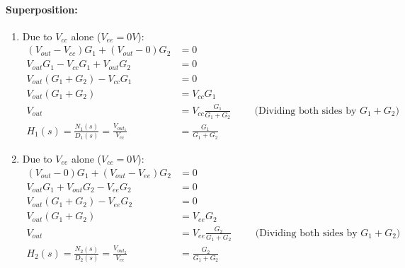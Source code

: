 \paragraph{Superposition:}
\begin{enumerate}
  \item Due to \(V_{cc}\) alone (\(V_{ee} = 0V\)):
    \begin{align*}
      (V_{out} - V_{cc}){G_1} + (V_{out} - 0){G_2} &= 0 \\
      V_{out}G_1 - V_{cc}G_1 + V_{out}G_2 &= 0 \\
      V_{out}(G_1 + G_2) - V_{cc}G_1 &= 0 \\
      V_{out}(G_1 + G_2) &= V_{cc}G_1 \\
      V_{out} &= V_{cc}\frac{G_1}{G_1 + G_2} \hspace{1cm} \text{(Dividing both sides by \(G_1 + G_2\))} \\
      H_1(s) = \frac{N_1(s)}{D_1(s)} = \frac{V_{out_1}}{V_{cc}} &= \frac{G_1}{G_1 + G_2}
    \end{align*}
  \item Due to \(V_{ee}\) alone (\(V_{cc} = 0V\)):
    \begin{align*}
      (V_{out} - 0){G_1} + (V_{out} - V_{ee}){G_2} &= 0 \\
      V_{out}G_1 + V_{out}G_2 - V_{ee}G_2 &= 0 \\
      V_{out}(G_1 + G_2) - V_{ee}G_2 &= 0 \\
      V_{out}(G_1 + G_2) &= V_{ee}G_2 \\
      V_{out} &= V_{ee}\frac{G_2}{G_1 + G_2} \hspace{1cm} \text{(Dividing both sides by \(G_1 + G_2\))} \\
      H_2(s) = \frac{N_2(s)}{D_2(s)} = \frac{V_{out_2}}{V_{ee}} &= \frac{G_2}{G_1 + G_2}
    \end{align*}
\end{enumerate}
